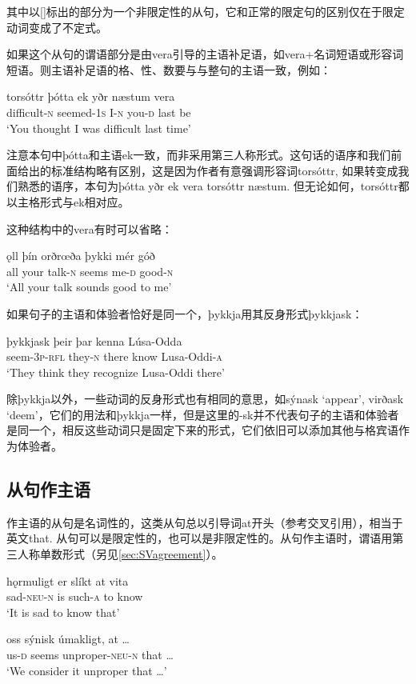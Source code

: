 其中以[]标出的部分为一个非限定性的从句，它和正常的限定句的区别仅在于限定动词变成了不定式。

如果这个从句的谓语部分是由vera引导的主语补足语，如vera+名词短语或形容词短语。则主语补足语的格、性、数要与与整句的主语一致，例如：
\begin{exe}
    \ex 
    \gll torsóttr	þótta	ek	yðr	næstum	vera\\
difficult-\textsc{n}	seemed-{\footnotesize 1}\textsc{s}	I-\textsc{n}	you-\textsc{d}	last	be\\
\trans `You thought I was difficult last time’
    
\end{exe}

注意本句中þótta和主语ek一致，而非采用第三人称形式。这句话的语序和我们前面给出的标准结构略有区别，这是因为作者有意强调形容词torsóttr, 如果转变成我们熟悉的语序，本句为þótta yðr ek vera torsóttr næstum. 但无论如何，torsóttr都以主格形式与ek相对应。

这种结构中的vera有时可以省略：
\begin{exe}
    \ex
    \gll ǫll	þín	orðrœða	þykki	mér	góð\\
all	your	talk-\textsc{n}	seems	me-\textsc{d}	good-\textsc{n}\\
\trans `All your talk sounds good to me’
\end{exe}

如果句子的主语和体验者恰好是同一个，þykkja用其反身形式þykkjask：
\begin{exe}
    \ex
    \gll þykkjask	þeir	þar	kenna	Lúsa-Odda\\
seem-{\footnotesize 3}\textsc{p}-\textsc{rfl}	they-\textsc{n}	there	know	Lusa-Oddi-\textsc{a}\\
\trans `They think they recognize Lusa-Oddi there’
\end{exe}

除þykkja以外，一些动词的反身形式也有相同的意思，如sýnask `appear’, virðask `deem’，它们的用法和þykkja一样，但是这里的-sk并不代表句子的主语和体验者是同一个，相反这些动词只是固定下来的形式，它们依旧可以添加其他与格宾语作为体验者。

\subsection{从句作主语}
作主语的从句是名词性的，这类从句总以引导词at开头（参考交叉引用），相当于英文that. 从句可以是限定性的，也可以是非限定性的。从句作主语时，谓语用第三人称单数形式（另见\ref{sec:SVagreement}）。
\begin{exe}
\ex 
\gll hǫrmuligt	er	slíkt	at	vita\\
sad-\textsc{neu}-\textsc{n}	is	such-\textsc{a}	to	know\\
\trans `It is sad to know that’

\ex
\gll oss	sýnisk	úmakligt,	at	…\\
us-\textsc{d}	seems	unproper-\textsc{neu}-\textsc{n}	that	…\\
\trans `We consider it unproper that …’
\end{exe}


